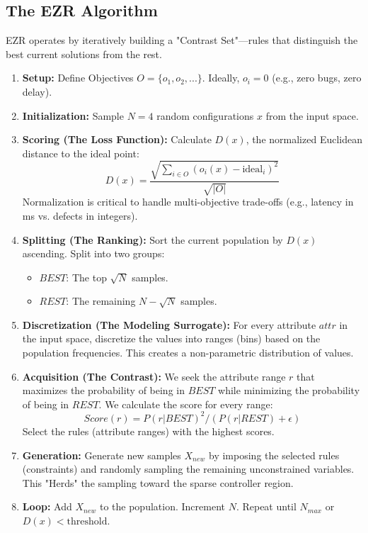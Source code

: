 \documentclass[runningheads]{llncs}
\begin{document}
\subsection{The EZR Algorithm}
EZR operates by iteratively building a "Contrast Set"---rules that 
distinguish the best current solutions from the rest.

\begin{enumerate}
    \item \textbf{Setup:} Define Objectives $O = \{o_1, o_2, ...\}$. 
    Ideally, $o_i=0$ (e.g., zero bugs, zero delay).
    
    \item \textbf{Initialization:} 
    Sample $N=4$ random configurations $x$ from the input space.
    
    \item \textbf{Scoring (The Loss Function):}
    Calculate $D(x)$, the normalized Euclidean distance to the ideal point:
    \begin{equation}
        D(x) = \frac{\sqrt{\sum_{i \in O} (o_i(x) - \text{ideal}_i)^2}}{\sqrt{|O|}}
    \end{equation}
    Normalization is critical to handle multi-objective trade-offs (e.g., 
    latency in ms vs. defects in integers).

    \item \textbf{Splitting (The Ranking):}
    Sort the current population by $D(x)$ ascending.
    Split into two groups:
    \begin{itemize}
        \item $BEST$: The top $\sqrt{N}$ samples.
        \item $REST$: The remaining $N - \sqrt{N}$ samples.
    \end{itemize}

    \item \textbf{Discretization (The Modeling Surrogate):}
    For every attribute $attr$ in the input space, discretize the values 
    into ranges (bins) based on the population frequencies. This creates 
    a non-parametric distribution of values.
    
    \item \textbf{Acquisition (The Contrast):}
    We seek the attribute range $r$ that maximizes the probability of being 
    in $BEST$ while minimizing the probability of being in $REST$. We 
    calculate the score for every range:
    \begin{equation}
        Score(r) = P(r | BEST)^2 / (P(r | REST) + \epsilon)
    \end{equation}
    Select the rules (attribute ranges) with the highest scores.  

    \item \textbf{Generation:}
    Generate new samples $X_{new}$ by imposing the selected rules (constraints) 
    and randomly sampling the remaining unconstrained variables. This 
    "Herds" the sampling toward the sparse controller region.

    \item \textbf{Loop:}
    Add $X_{new}$ to the population. Increment $N$. Repeat until $N_{max}$ 
    or $D(x) < \text{threshold}$.
\end{enumerate}
\end{document}
